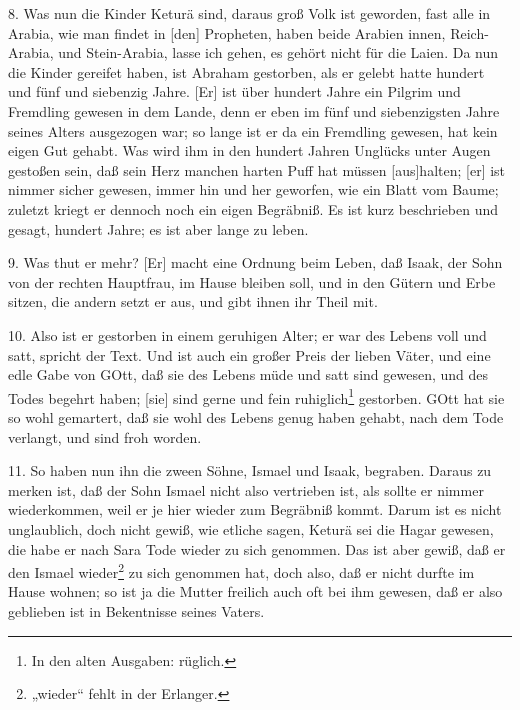8. Was nun die Kinder Keturä sind, daraus groß Volk ist geworden, fast alle in Arabia, wie man findet in [den] Propheten, haben beide Arabien innen, Reich-Arabia, und Stein-Arabia, lasse ich gehen, es gehört nicht für die Laien. Da nun die Kinder gereifet haben, ist Abraham gestorben, als er gelebt hatte hundert und fünf und siebenzig Jahre. [Er] ist über hundert Jahre ein Pilgrim und Fremdling gewesen in dem Lande, denn er eben im fünf und siebenzigsten Jahre seines Alters ausgezogen war; so lange ist er da ein Fremdling gewesen, hat kein eigen Gut gehabt. Was wird ihm in den hundert Jahren Unglücks unter Augen gestoßen sein, daß sein Herz manchen harten Puff hat müssen [aus]halten; [er] ist nimmer sicher gewesen, immer hin und her geworfen, wie ein Blatt vom Baume; zuletzt kriegt er dennoch noch ein eigen Begräbniß. Es ist kurz beschrieben und gesagt, hundert Jahre; es ist aber lange zu leben.

9. Was thut er mehr? [Er] macht eine Ordnung beim Leben, daß Isaak, der Sohn von der rechten Hauptfrau, im Hause bleiben soll, und in den Gütern und Erbe sitzen, die andern setzt er aus, und gibt ihnen ihr Theil mit.

10. Also ist er gestorben in einem geruhigen Alter; er war des Lebens voll und satt, spricht der Text. Und ist auch ein großer Preis der lieben Väter, und eine edle Gabe von GOtt, daß sie des Lebens müde und satt sind gewesen, und des Todes begehrt haben; [sie] sind gerne und fein ruhiglich\footnote{In den alten Ausgaben: rüglich.} gestorben. GOtt hat sie so wohl gemartert, daß sie wohl des Lebens genug haben gehabt, nach dem Tode verlangt, und sind froh worden.

11. So haben nun ihn die zween Söhne, Ismael und Isaak, begraben. Daraus zu merken ist, daß der Sohn Ismael nicht also vertrieben ist, als sollte er nimmer wiederkommen, weil er je hier wieder zum Begräbniß kommt. Darum ist es nicht unglaublich, doch nicht gewiß, wie etliche sagen, Keturä sei die Hagar gewesen, die habe er nach Sara Tode wieder zu sich genommen. Das ist aber gewiß, daß er den Ismael wieder\footnote{„wieder“ fehlt in der Erlanger.} zu sich genommen hat, doch also, daß er nicht durfte im Hause wohnen; so ist ja die Mutter freilich auch oft bei ihm gewesen, daß er also geblieben ist in Bekentnisse seines Vaters.


